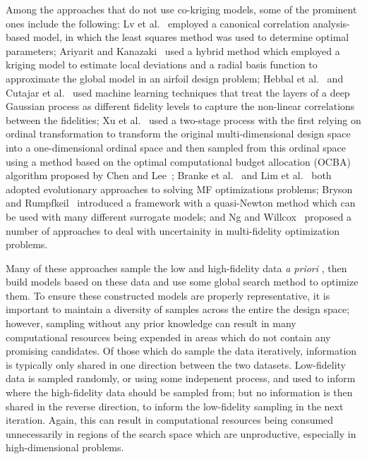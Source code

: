 Among the approaches that do not use co-kriging models, some of the prominent ones include the following: Lv et al.~\cite{lv2021multi} employed a canonical correlation analysis-based model, in which the least squares method was used to determine optimal parameters; Ariyarit and Kanazaki~\cite{ariyarit2017multi} used a hybrid method which employed a kriging model to estimate local deviations and a radial basis function to approximate the global model in an airfoil design problem; Hebbal et al.~\cite{hebbal2021multi} and Cutajar et al.~\cite{cutajar2019deep} used machine learning techniques that treat the layers of a deep Gaussian process as different fidelity levels to capture the non-linear correlations between the fidelities; Xu et al.~\cite{xu2016mo2tos} used a two-stage process with the first relying on ordinal transformation to transform the original multi-dimensional design space into a one-dimensional ordinal space and then sampled from this ordinal space using a method based on the optimal computational budget allocation (OCBA) algorithm proposed by Chen and Lee~\cite{chen2011stochastic}; Branke et al.~\cite{branke2016efficient} and Lim et al.~\cite{lim2008evolutionary} both adopted evolutionary approaches to solving MF optimizations problems; Bryson and Rumpfkeil~\cite{bryson2018multifidelity} introduced a framework with a quasi-Newton method which can be used with many different surrogate models; and Ng and Willcox~\cite{ng2014multifidelity} proposed a number of approaches to deal with uncertainity in multi-fidelity optimization problems.

Many of these approaches sample the low and high-fidelity data \emph{a priori} , then build models based on these data and use some global search method to optimize them. To ensure these constructed models are properly representative, it is important to maintain a diversity of samples across the entire the design space; however, sampling without any prior knowledge can result in many computational resources being expended in areas which do not contain any promising candidates. Of those which do sample the data iteratively, information is typically only shared in one direction between the two datasets. Low-fidelity data is sampled randomly, or using some indepenent process, and used to inform where the high-fidelity data should be sampled from; but no information is then shared in the reverse direction, to inform the low-fidelity sampling in the next iteration. Again, this can result in computational resources being consumed unnecessarily in regions of the search space which are unproductive, especially in high-dimensional problems. 


